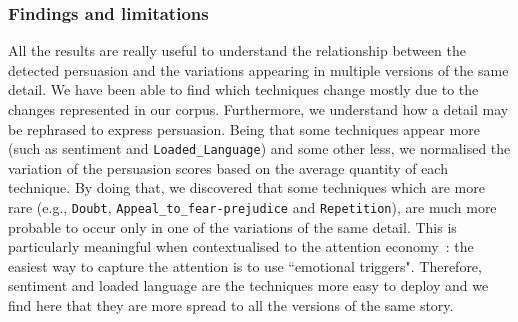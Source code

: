 


\subsubsection{Findings and limitations}

All the results are really useful to understand the relationship between the detected persuasion and the variations appearing in multiple versions of the same detail.
We have been able to find which techniques change mostly due to the changes represented in our corpus. Furthermore, we understand how a detail may be rephrased to express persuasion.
Being that some techniques appear more (such as sentiment and \texttt{Loaded\_Language}) and some other less, we normalised the variation of the persuasion scores based on the average quantity of each technique.
 By doing that, we discovered that some techniques which are more rare (e.g., \texttt{Doubt}, \texttt{Appeal\_to\_fear-prejudice} and \texttt{Repetition}), are much more probable to occur only in one of the variations of the same detail.
This is particularly meaningful when contextualised to the attention economy~\citep{davenport2001attention}:
the easiest way to capture the attention is to use ``emotional triggers".
Therefore, sentiment and loaded language are the techniques more easy to deploy and we find here that they are more spread to all the versions of the same story.


